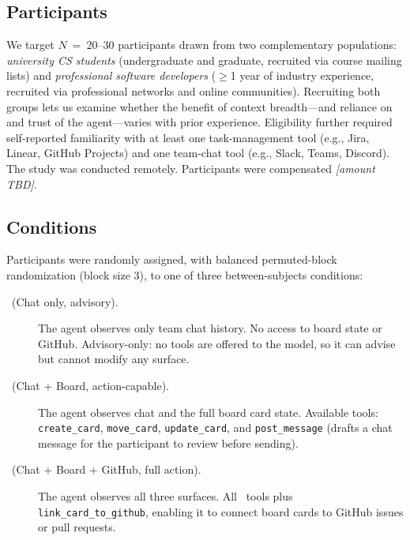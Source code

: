 \subsection{Participants}
\label{sec:study:participants}


We target $N$~=~20--30 participants drawn from two complementary populations:
\emph{university CS students} (undergraduate and graduate, recruited via course
mailing lists) and \emph{professional software developers} ($\geq$1 year of
industry experience, recruited via professional networks and online
communities). Recruiting both groups lets us examine whether the benefit of
context breadth---and reliance on and trust of the agent---varies with prior
experience. Eligibility further required self-reported familiarity with at least
one task-management tool (e.g., Jira, Linear, GitHub Projects) and one team-chat
tool (e.g., Slack, Teams, Discord). The study was conducted remotely.
Participants were compensated \emph{[amount TBD]}.

\subsection{Conditions}
\label{sec:study:conditions}

Participants were randomly assigned, with balanced permuted-block randomization
(block size 3), to one of three between-subjects conditions:

\begin{description}
  \item[\CI~(Chat only, advisory).] The agent observes only team chat history.
    No access to board state or GitHub. Advisory-only: no tools are offered to
    the model, so it can advise but cannot modify any surface.

  \item[\CII~(Chat + Board, action-capable).] The agent observes chat and the
    full board card state. Available tools: \texttt{create\_card},
    \texttt{move\_card}, \texttt{update\_card}, and \texttt{post\_message}
    (drafts a chat message for the participant to review before sending).

  \item[\CIII~(Chat + Board + GitHub, full action).] The agent observes all
    three surfaces. All \CII\ tools plus \texttt{link\_card\_to\_github},
    enabling it to connect board cards to GitHub issues or pull requests.
\end{description}

